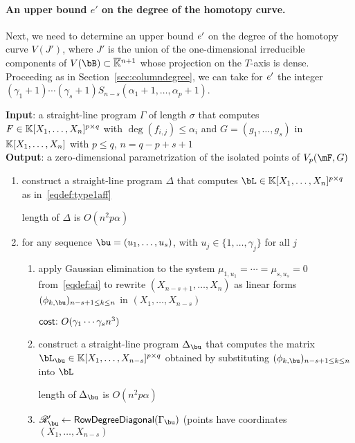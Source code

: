 \documentclass[12pt]{article}
\begin{document}
\paragraph{An upper bound $e'$ on the degree of the homotopy curve.}
Next, we need to determine an upper bound ${e'}{}$ on the degree of the
homotopy curve $V(J')$, where $J'$ is the union of the one-dimensional
irreducible components of $V(\bB) \subset \KKbar{}^{n+1}$ whose
projection on the $T$-axis is dense. Proceeding as in
Section~\ref{sec:columndegree}, we can take for ${e'}{}$ the integer
$(\gamma_1+1)\cdots(\gamma_s+1) S_{n-s}(\alpha_1
+1,\dots,\alpha_p+1)$.

\medskip



\begin{algorithm}[!t]
\caption{$\mathsf{RowDegree\_simple}(\Gamma)$}
{\bf Input}:  a straight-line program $\Gamma$ of length $\sigma$ that computes
 $F \in \mathbb{K}[X_1, \ldots, X_n]^{p \times q}$ with $\deg(f_{i,j}) \leq \alpha_i$
and $G = (g_1, \ldots, g_s)$ in $\mathbb{K}[X_1, \ldots, X_n]$ with $p \leq q$, $n = q-p+s+1$\\
{\bf Output}: a zero-dimensional parametrization of the isolated points of $\VpFG{p}{\mF}{G}$
\begin{enumerate}
\item construct a straight-line program $\Delta$ that computes
  $\bL \in \KK[X_1,\dots,X_n]^{p \times q}$ as
  in~\eqref{eqdef:type1aff}
  
\hfill length of $\Delta$ is $O(n^2 p \alpha)$
\item for any sequence $\bu=(u_1,\dots,u_s)$, with $u_j \in \{1,\dots,\gamma_j\}$ for all $j$
\begin{enumerate}
\item apply Gaussian elimination to the system 
  $\mu_{1,u_1}=\cdots=\mu_{s,u_s}=0$ from~\eqref{eqdef:ai} to
  rewrite $(X_{n-s+1}, \ldots, X_n)$ as linear forms
  $(\phi_{k,\bu})_{n-s+1 \le k \le n}$ in $(X_1,\dots,X_{n-s})$
  
\hfill  $\text{\sf{cost:~}} O(\gamma_1 \cdots \gamma_s n^3)$

\item construct a straight-line program $\Delta_{\bu}$ that computes the matrix 
  $\bL_\bu  \in \KK[X_1, \dots, X_{n-s}]^{p \times q}$ obtained
  by substituting $(\phi_{k,\bu})_{n-s+1 \le k \le n}$ into $\bL$
  
  \hfill length of $\Delta_{\bu}$ is $O(n^2 p\alpha)$

\item $\scrR'_\bu \gets \mathsf{RowDegreeDiagonal}(\Gamma_\bu)$ (points have coordinates $(X_1,\dots,X_{n-s})$
  

\end{enumerate}
\end{enumerate}
\end{algorithm}
\end{document}
